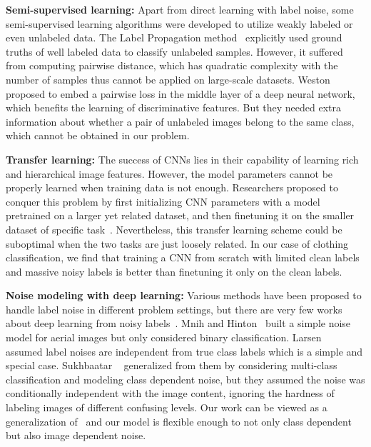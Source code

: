 \documentclass[10pt,twocolumn,letterpaper]{article}
\begin{document}
{\bf Semi-supervised learning:} Apart from direct learning with label noise, some semi-supervised learning algorithms were developed to utilize weakly labeled or even unlabeled data. The Label Propagation method~\cite{zhu2002learning} explicitly used ground truths of well labeled data to classify unlabeled samples. However, it suffered from computing pairwise distance, which has quadratic complexity with the number of samples thus cannot be applied on large-scale datasets. Weston \etal~\cite{weston2012deep} proposed to embed a pairwise loss in the middle layer of a deep neural network, which benefits the learning of discriminative features. But they needed extra information about whether a pair of unlabeled images belong to the same class, which cannot be obtained in our problem.

{\bf Transfer learning:} The success of CNNs lies in their capability of learning rich and hierarchical image features. However, the model parameters cannot be properly learned when training data is not enough. Researchers proposed to conquer this problem by first initializing CNN parameters with a model pretrained on a larger yet related dataset, and then finetuning it on the smaller dataset of specific task~\cite{krizhevsky2012imagenet, oquab2014learning, azizpour2014generic,donahue2013decaf}. Nevertheless, this transfer learning scheme could be suboptimal when the two tasks are just loosely related. In our case of clothing classification, we find that training a CNN from scratch with limited clean labels and massive noisy labels is better than finetuning it only on the clean labels.

{\bf Noise modeling with deep learning:} Various methods have been proposed to handle label noise in different problem settings, but there are very few works about deep learning from noisy labels~\cite{mnih2012learning, larsen1998design, sukhbaatar2014learning}. Mnih and Hinton~\cite{mnih2012learning} built a simple noise model for aerial images but only considered binary classification. Larsen \etal~\cite{larsen1998design} assumed label noises are independent from true class labels which is a simple and special case. Sukhbaatar \etal~\cite{sukhbaatar2014learning} generalized from them by considering multi-class classification and modeling class dependent noise, but they assumed the noise was conditionally independent with the image content, ignoring the hardness of labeling images of different confusing levels. Our work can be viewed as a generalization of~\cite{sukhbaatar2014learning,natarajan2013learning} and our model is flexible enough to not only class dependent but also image dependent noise.
\end{document}
